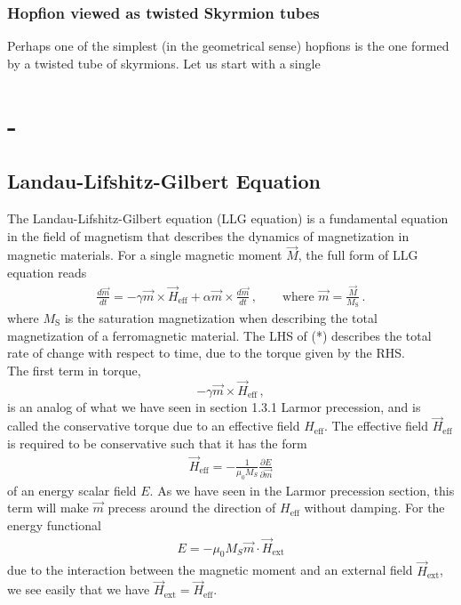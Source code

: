 \documentclass[11pt, onesided]{book}
\theoremstyle{break}
\theoremstyle{break}
\newcommand{\pd}{\partial}
\begin{document}
\subsection*{Hopfion viewed as twisted Skyrmion tubes}
Perhaps one of the simplest (in the geometrical sense) hopfions is the one formed by a twisted tube of skyrmions. Let us start with a single 


\chapter{-}
\section{Landau-Lifshitz-Gilbert Equation}
The Landau-Lifshitz-Gilbert equation (LLG equation) is a fundamental equation in the field of magnetism that describes the dynamics of magnetization in magnetic materials. For a single magnetic moment $\vec{M}$, the full form of LLG equation reads
\begin{align*}
\frac{d\vec{m}}{dt} = -\gamma \vec{m}\times \vec{H}_{\text{eff}} + \alpha \vec{m}\times \frac{d\vec{m}}{dt}\,,\qquad
\text{where } \vec{m} = \frac{\vec{M}}{M_\text{S}}\,.\tag{*}
\end{align*}
where $M_{\text{S}}$ is the saturation magnetization when describing the total magnetization of a ferromagnetic material. The LHS of (*) describes the total rate of change with respect to time, due to the torque given by the RHS. \\


The first term in torque,
$$-\gamma\vec{m} \times \vec{H}_{\text{eff}}\,,$$ 
is an analog of what we have seen in section 1.3.1 Larmor precession, and is called the conservative torque due to an effective field $H_{\text{eff}}$. 
The effective field $\vec{H}_{\text{eff}}$ is required to be conservative such that it has the form 
\begin{align*}
\vec{H}_{\text{eff}} = -\frac{1}{\mu_0 M_S}\frac{\pd E}{ \pd\vec{m}}
\end{align*}
of an energy scalar field $E$. As we have seen in the Larmor precession section, this term will make $\vec{m}$ precess around the direction of $H_{\text{eff}}$ without damping. For the energy functional 
\begin{align*}
E = -\mu_0 M_S \vec{m}\cdot \vec{H}_{\text{ext}}
\end{align*}
due to the interaction between the magnetic moment and an external field $\vec{H}_{\text{ext}}$, we see easily that we have $\vec{H}_{\text{ext}} = \vec{H}_{\text{eff}}$. \\
\end{document}
